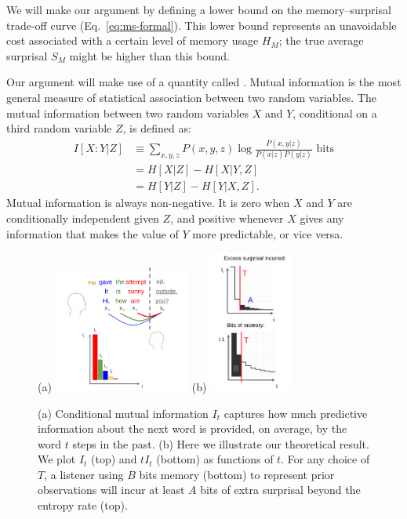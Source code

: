 We will make our argument by defining a lower bound on the memory--surprisal trade-off curve (Eq.~\ref{eq:ms-formal}). This lower bound represents an unavoidable cost associated with a certain level of memory usage $H_M$; the true average surprisal $S_M$ might be higher than this bound. 

Our argument will make use of a quantity called . Mutual information is the most general measure of statistical association between two random variables. The mutual information between two random variables $X$ and $Y$, conditional on a third random variable $Z$, is defined as:
\begin{align}
\label{eq:mi}
    I[X:Y|Z] &\equiv \sum_{x,y,z} P(x,y,z) \log \frac{P(x,y|z)}{P(x|z)P(y|z)} \text{ bits} \\
    \nonumber
    &= H[X|Z] - H[X|Y,Z] \\
    \nonumber
    &= H[Y|Z] - H[Y|X,Z].
\end{align}
Mutual information is always non-negative. It is zero when $X$ and $Y$ are conditionally independent given $Z$, and positive whenever $X$ gives any information that makes the value of $Y$ more predictable, or vice versa. 


\begin{figure}
	(a)
\includegraphics[width=0.4\textwidth]{figures-gdrive/mi-distance.pdf}
	(b)
\includegraphics[width=0.25\textwidth]{figures-gdrive/theorem.pdf}
	\caption{
		(a) Conditional mutual information $I_t$ captures how much predictive information about the next word is provided, on average, by the word $t$ steps in the past.
		(b) Here we illustrate our theoretical result. We plot $I_t$ (top) and $tI_t$ (bottom) as functions of $t$. For any choice of $T$, a listener using $B$ bits memory (bottom) to represent prior observations will incur at least $A$ bits of extra surprisal beyond the entropy rate (top). 
}\label{fig:theorem}
\end{figure}





